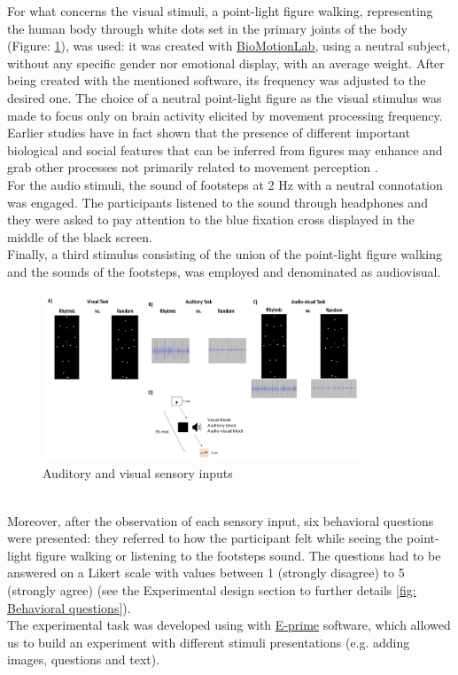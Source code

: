 For what concerns the visual stimuli, a point-light figure walking, representing the human body through white dots set in the primary joints of the body (Figure: \ref{fig: visual stimuli}), was used: it was created with \href{https://www.biomotionlab.ca/html5-bml-walker/}{BioMotionLab}, using a neutral subject, without any specific gender nor emotional display, with an average weight. After being created with the mentioned software, its frequency was adjusted to the desired one. The choice of a neutral point-light figure as the visual stimulus was made to focus only on brain activity elicited by movement processing frequency. Earlier studies have in fact shown that the presence of different important biological and social features that can be inferred from figures may enhance and grab other processes not primarily related to movement perception \parencite{Cracco_2022}. \\
For the audio stimuli, the sound of footsteps at 2 Hz with a neutral connotation was engaged. The participants listened to the sound through headphones and they were asked to pay attention to the blue fixation cross displayed in the middle of the black screen. \\
Finally, a third stimulus consisting of the union of the point-light figure walking and the sounds of the footsteps, was employed and denominated as audiovisual. 
\begin{figure}[h]
    \centering
        \includegraphics[width=0.85\textwidth]{appendix/Picture 1.png}
        \caption{Auditory and visual sensory inputs}
        \label{fig: visual stimuli}
\end{figure} \\
Moreover, after the observation of each sensory input, six behavioral questions were presented: they referred to how the participant felt while seeing the point-light figure walking or listening to the footsteps sound. The questions had to be answered on a Likert scale with values between 1 (strongly disagree) to 5 (strongly agree) (see the Experimental design section to further details \ref{fig: Behavioral questions}). \\
The experimental task was developed using with \href{https://pstnet.com/products/e-prime/}{E-prime} software, which allowed us to build an experiment with different stimuli presentations (e.g. adding images, questions and text).

